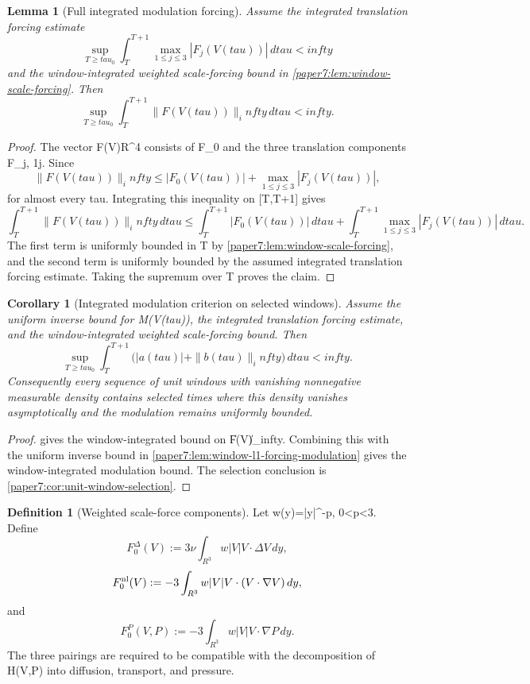\documentclass[11pt]{amsart}
\def\({}%
\def\){}%
\def\mathbb#1{#1}%
\def\tau{tau}%
\def\infty{infty}%
\theoremstyle{plain}
\newtheorem{lemma}[lemma]{Lemma}
\newtheorem{corollary}[corollary]{Corollary}
\theoremstyle{definition}
\newtheorem{definition}[definition]{Definition}
\theoremstyle{remark}
\begin{document}
\begin{lemma}[Full integrated modulation forcing]
\label{paper7:lem:window-modulation-forcing}
Assume the integrated translation forcing estimate
\[
  \sup_{T\ge\tau_0}
  \int_T^{T+1}\max_{1\le j\le3}|F_j(V(\tau))|\,d\tau<\infty
\]
and the window-integrated weighted scale-forcing bound in
\cref{paper7:lem:window-scale-forcing}.  Then
\[
  \sup_{T\ge\tau_0}
  \int_T^{T+1}\|F(V(\tau))\|_\infty\,d\tau<\infty .
\]
\end{lemma}

\begin{proof}
The vector \(F(V)\in\mathbb R^4\) consists of \(F_0\) and the three
translation components \(F_j\), \(1\le j\).  Since
\[
  \|F(V(\tau))\|_\infty
  \le
  |F_0(V(\tau))|+\max_{1\le j\le3}|F_j(V(\tau))|,
\]
for almost every \(\tau\).  Integrating this inequality on \([T,T+1]\) gives
\[
  \int_T^{T+1}\|F(V(\tau))\|_\infty\,d\tau
  \le
  \int_T^{T+1}|F_0(V(\tau))|\,d\tau
  +
  \int_T^{T+1}\max_{1\le j\le3}|F_j(V(\tau))|\,d\tau .
\]
The first term is uniformly bounded in \(T\) by
\cref{paper7:lem:window-scale-forcing}, and the second term is uniformly
bounded by the assumed integrated translation forcing estimate.  Taking the
supremum over \(T\) proves the claim.
\end{proof}

\begin{corollary}[Integrated modulation criterion on selected windows]
\label{paper7:cor:selected-window-modulation}
Assume the uniform inverse bound for \(M(V(\tau))\), the integrated
translation forcing estimate, and the window-integrated weighted scale-forcing
bound.  Then
\[
  \sup_{T\ge\tau_0}
  \int_T^{T+1}\bigl(|a(\tau)|+\|b(\tau)\|_\infty\bigr)\,d\tau<\infty.
\]
Consequently every sequence of unit windows with vanishing nonnegative
measurable density contains selected times where this density vanishes
asymptotically and the modulation remains uniformly bounded.
\end{corollary}

\begin{proof}
 gives the
window-integrated bound on \(\|F(V)\|_\infty\).  Combining this with the
uniform inverse bound in
\cref{paper7:lem:window-l1-forcing-modulation} gives the
window-integrated modulation bound.  The selection conclusion is
\cref{paper7:cor:unit-window-selection}.
\end{proof}

\begin{definition}[Weighted scale-force components]
\label{paper7:def:scale-force-components}
Let \(w(y)=|y|^{-p}\), \(0<p<3\).  Define
\[
  F_0^\Delta(V)
  :=
  3\nu\int_{\mathbb R^3}w|V|V\cdot\Delta V\,dy,
\]
\[
  F_0^{\rm nl}(V)
  :=
  -3\int_{\mathbb R^3}w|V|V\cdot(V\cdot\nabla V)\,dy,
\]
and
\[
  F_0^P(V,P)
  :=
  -3\int_{\mathbb R^3}w|V|V\cdot\nabla P\,dy.
\]
The three pairings are required to be compatible with the decomposition of
\(H(V,P)\) into diffusion, transport, and pressure.
\end{definition}
\end{document}
